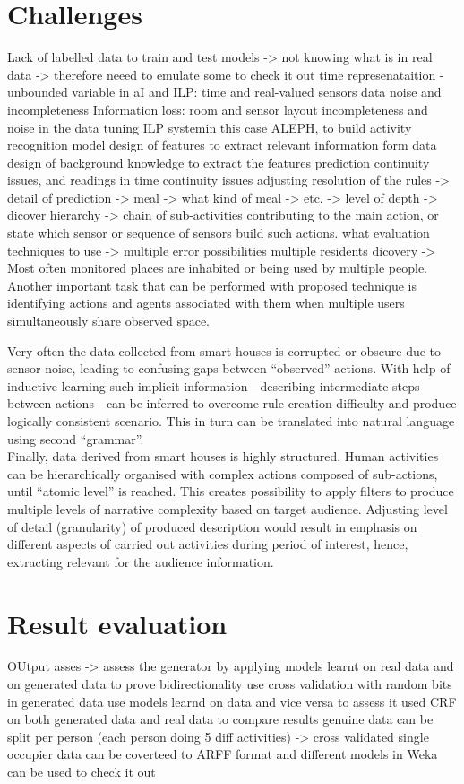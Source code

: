 \documentclass[12pt, a4paper, pdflatex, leqno, twoside, openright]{report}
\begin{document}
\section{Challenges}
Lack of labelled data to train and test models -> not knowing what is in real data -> therefore neeed to emulate some to check it out
time represenataition - unbounded variable in aI and ILP: time and real-valued sensors
data noise and incompleteness
Information loss: room and sensor layout
incompleteness and noise in the data
tuning ILP systemin this case ALEPH, to build activity recognition model
design of features to extract relevant information form data
design of background knowledge to extract the features
prediction continuity issues, and readings in time continuity issues
adjusting resolution of the rules -> detail of prediction -> meal -> what kind of meal -> etc. -> level of depth -> dicover hierarchy -> chain of sub-activities contributing to the main action, or state which sensor or sequence of sensors build such actions.
what evaluation techniques to use -> multiple error possibilities
multiple residents dicovery -> Most often monitored places are inhabited or being used by multiple people. Another important task that can be performed with proposed technique is identifying actions and agents associated with them when multiple users simultaneously share observed space.

Very often the data collected from smart houses is corrupted or obscure due to sensor noise, leading to confusing gaps between ``observed'' actions. With help of inductive learning such implicit information---describing intermediate steps between actions---can be inferred to overcome rule creation difficulty and produce logically consistent scenario. This in turn can be translated into natural language using second ``grammar''.\\

Finally, data derived from smart houses is highly structured. Human activities can be hierarchically organised with complex actions composed of sub-actions, until ``atomic level'' is reached. This creates possibility to apply filters to produce multiple levels of narrative complexity based on target audience. Adjusting level of detail (granularity) of produced description would result in emphasis on different aspects of carried out activities during period of interest, hence, extracting relevant for the audience information.

\section{Result evaluation}
OUtput asses ->
assess the generator by applying models learnt on real data and on generated data to prove bidirectionality
use cross validation with random bits in generated data
use models learnd on data and vice versa to assess it
used CRF on both generated data and real data to compare results
genuine data can be split per person (each person doing 5 diff activities) -> cross validated
single occupier data can be coverteed to ARFF format and different models in Weka can be used to check it out
\end{document}
